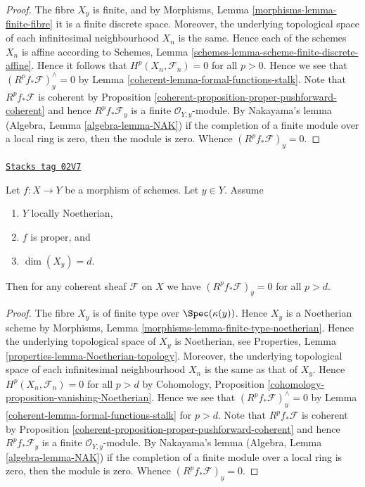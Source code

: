 \begin{proof}

The fibre $X_y$ is finite, and by
Morphisms, Lemma \ref{morphisms-lemma-finite-fibre} it
is a finite discrete space. Moreover, the underlying topological
space of each infinitesimal neighbourhood $X_n$ is the same.
Hence each of the schemes $X_n$ is affine according to
Schemes, Lemma \ref{schemes-lemma-scheme-finite-discrete-affine}.
Hence it follows that $H^p(X_n, \mathcal{F}_n) = 0$ for all
$p > 0$. Hence we see that $(R^pf_*\mathcal{F})_y^\wedge = 0$
by Lemma \ref{coherent-lemma-formal-functions-stalk}.
Note that $R^pf_*\mathcal{F}$ is coherent by
Proposition \ref{coherent-proposition-proper-pushforward-coherent} and
hence $R^pf_*\mathcal{F}_y$ is a finite
$\mathcal{O}_{Y, y}$-module. By Nakayama's lemma
(Algebra, Lemma \ref{algebra-lemma-NAK})
if the completion of a finite module over a local ring
is zero, then the module is zero. Whence
$(R^pf_*\mathcal{F})_y = 0$.
\end{proof}

\begin{lemma}
\label{coherent-lemma-higher-direct-images-zero-above-dimension-fibre}
\href{https://stacks.math.columbia.edu/tag/02V7}{\texttt{Stacks tag 02V7}}

Let $f : X \to Y$ be a morphism of schemes.
Let $y \in Y$.
Assume
\begin{enumerate}
\item $Y$ locally Noetherian,
\item $f$ is proper, and
\item $\dim(X_y) = d$.
\end{enumerate}
Then for any coherent sheaf $\mathcal{F}$ on $X$ we have
$(R^pf_*\mathcal{F})_y = 0$ for all $p > d$.
\end{lemma}

\begin{proof}

The fibre $X_y$ is of finite type over $\Spec(\kappa(y))$.
Hence $X_y$ is a Noetherian scheme by
Morphisms, Lemma \ref{morphisms-lemma-finite-type-noetherian}.
Hence the underlying topological space of $X_y$ is Noetherian, see
Properties, Lemma \ref{properties-lemma-Noetherian-topology}.
Moreover, the underlying topological space of each infinitesimal
neighbourhood $X_n$ is the same as that of $X_y$.
Hence $H^p(X_n, \mathcal{F}_n) = 0$ for all $p > d$ by
Cohomology, Proposition \ref{cohomology-proposition-vanishing-Noetherian}.
Hence we see that $(R^pf_*\mathcal{F})_y^\wedge = 0$
by Lemma \ref{coherent-lemma-formal-functions-stalk} for $p > d$.
Note that $R^pf_*\mathcal{F}$ is coherent by
Proposition \ref{coherent-proposition-proper-pushforward-coherent} and
hence $R^pf_*\mathcal{F}_y$ is a finite
$\mathcal{O}_{Y, y}$-module. By Nakayama's lemma
(Algebra, Lemma \ref{algebra-lemma-NAK})
if the completion of a finite module over a local ring
is zero, then the module is zero. Whence
$(R^pf_*\mathcal{F})_y = 0$.
\end{proof}

